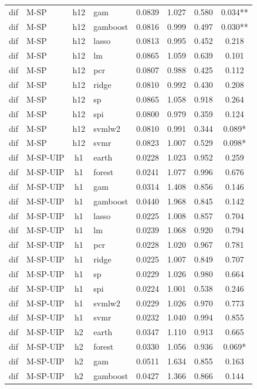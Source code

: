 \begin{ThreePartTable}
\begin{longtable}[t]{llclcccc}
dif & M-SP & h12 & gam & 0.0839 & 1.027 & 0.580 & 0.034**\\
dif & M-SP & h12 & gamboost & 0.0816 & 0.999 & 0.497 & 0.030**\\
dif & M-SP & h12 & lasso & 0.0813 & 0.995 & 0.452 & 0.218\\
dif & M-SP & h12 & lm & 0.0865 & 1.059 & 0.639 & 0.101\\
dif & M-SP & h12 & pcr & 0.0807 & 0.988 & 0.425 & 0.112\\
dif & M-SP & h12 & ridge & 0.0810 & 0.992 & 0.430 & 0.208\\
dif & M-SP & h12 & sp & 0.0865 & 1.058 & 0.918 & 0.264\\
dif & M-SP & h12 & spi & 0.0800 & 0.979 & 0.359 & 0.124\\
dif & M-SP & h12 & svmlw2 & 0.0810 & 0.991 & 0.344 & 0.089*\\
dif & M-SP & h12 & svmr & 0.0823 & 1.007 & 0.529 & 0.098*\\
\addlinespace
dif & M-SP-UIP & h1 & earth & 0.0228 & 1.023 & 0.952 & 0.259\\
dif & M-SP-UIP & h1 & forest & 0.0241 & 1.077 & 0.996 & 0.676\\
dif & M-SP-UIP & h1 & gam & 0.0314 & 1.408 & 0.856 & 0.146\\
dif & M-SP-UIP & h1 & gamboost & 0.0440 & 1.968 & 0.845 & 0.142\\
dif & M-SP-UIP & h1 & lasso & 0.0225 & 1.008 & 0.857 & 0.704\\
dif & M-SP-UIP & h1 & lm & 0.0239 & 1.068 & 0.920 & 0.794\\
dif & M-SP-UIP & h1 & pcr & 0.0228 & 1.020 & 0.967 & 0.781\\
dif & M-SP-UIP & h1 & ridge & 0.0225 & 1.007 & 0.849 & 0.707\\
dif & M-SP-UIP & h1 & sp & 0.0229 & 1.026 & 0.980 & 0.664\\
dif & M-SP-UIP & h1 & spi & 0.0224 & 1.001 & 0.538 & 0.246\\
dif & M-SP-UIP & h1 & svmlw2 & 0.0229 & 1.026 & 0.970 & 0.773\\
dif & M-SP-UIP & h1 & svmr & 0.0232 & 1.040 & 0.994 & 0.855\\
\addlinespace
dif & M-SP-UIP & h2 & earth & 0.0347 & 1.110 & 0.913 & 0.665\\
dif & M-SP-UIP & h2 & forest & 0.0330 & 1.056 & 0.936 & 0.069*\\
dif & M-SP-UIP & h2 & gam & 0.0511 & 1.634 & 0.855 & 0.163\\
dif & M-SP-UIP & h2 & gamboost & 0.0427 & 1.366 & 0.866 & 0.144\\

\end{longtable}
\end{ThreePartTable}
